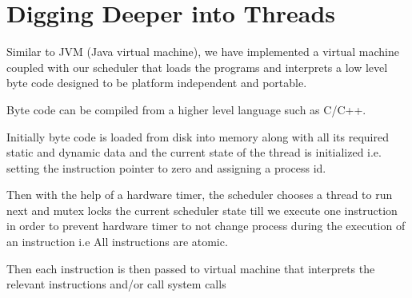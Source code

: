 \documentclass[12pt]{report}
\begin{document}
    \chapter{Digging Deeper into Threads}
    Similar to JVM (Java virtual machine), we have implemented a virtual machine coupled with 
    our scheduler that loads the programs and interprets a low level byte code designed to be 
    platform independent and portable.

    Byte code  can be compiled from a higher level language such as C/C++.

    Initially byte code is loaded from disk into memory along with all its required static and 
    dynamic data and the current state of the thread is initialized i.e. setting the instruction 
    pointer to zero and assigning a process id.

    Then with the help of a hardware timer, the scheduler chooses a thread to run next and 
    mutex locks the current scheduler state till we execute one instruction in order to 
    prevent hardware timer to not change process during the execution of an instruction 
    i.e All instructions are atomic.

    Then each instruction is then passed to virtual machine that interprets the relevant 
    instructions and/or call system calls
\end{document}
